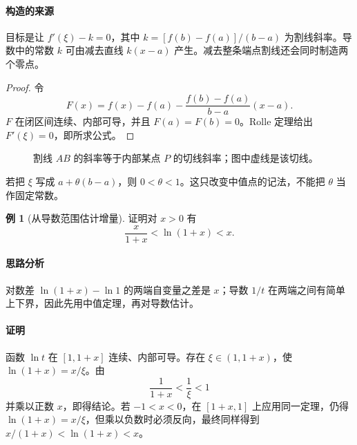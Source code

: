 \documentclass[UTF8,fontset=fandol,12pt,oneside,openany]{ctexrep}
\theoremstyle{definition}
\newtheorem{example}{例}[chapter]
\begin{document}
\paragraph{构造的来源}
目标是让 $f'(\xi)-k=0$，其中 $k=[f(b)-f(a)]/(b-a)$ 为割线斜率。导数中的常数 $k$ 可由减去直线 $k(x-a)$ 产生。减去整条端点割线还会同时制造两个零点。
\begin{proof}
令
\[
F(x)=f(x)-f(a)-\frac{f(b)-f(a)}{b-a}(x-a).
\]
$F$ 在闭区间连续、内部可导，并且 $F(a)=F(b)=0$。Rolle 定理给出 $F'(\xi)=0$，即所求公式。
\end{proof}
\begin{figure}[htbp]
\centering
{}
\caption{割线 $AB$ 的斜率等于内部某点 $P$ 的切线斜率；图中虚线是该切线。}
\end{figure}
若把 $\xi$ 写成 $a+\theta(b-a)$，则 $0<\theta<1$。这只改变中值点的记法，不能把 $\theta$ 当作固定常数。

\begin{example}[从导数范围估计增量]
证明对 $x>0$ 有
\[
\frac{x}{1+x}<\ln(1+x)<x.
\]
\end{example}
\paragraph{思路分析}
对数差 $\ln(1+x)-\ln1$ 的两端自变量之差是 $x$；导数 $1/t$ 在两端之间有简单上下界，因此先用中值定理，再对导数估计。
\paragraph{证明}
函数 $\ln t$ 在 $[1,1+x]$ 连续、内部可导。存在 $\xi\in(1,1+x)$，使 $\ln(1+x)=x/\xi$。由
\[
\frac1{1+x}<\frac1\xi<1
\]
并乘以正数 $x$，即得结论。若 $-1<x<0$，在 $[1+x,1]$ 上应用同一定理，仍得 $\ln(1+x)=x/\xi$，但乘以负数时必须反向，最终同样得到 $x/(1+x)<\ln(1+x)<x$。
\end{document}
